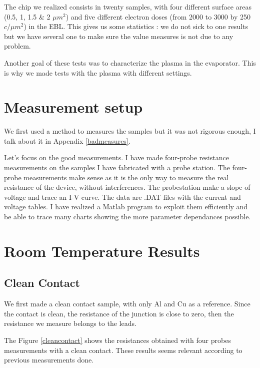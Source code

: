             The chip we realized consists in twenty samples, with four different surface areas (0.5, 1, 1.5 \& 2 $\mu m^2$) and five different electron doses (from 2000 to 3000 by 250 $c/\mu m^2$) in the EBL. This gives us some statistics : we do not sick to one results but we have several one to make sure the value measures is not due to any problem.
            
            Another goal of these tests was to characterize the plasma in the evaporator. This is why we made tests with the plasma with different settings.
            
        \section{Measurement setup}
            
            We first used a method to measures the samples but it was not rigorous enough, I talk about it in Appendix \ref{badmeasures}.
                
                Let's focus on the good measurements. I have made four-probe resistance measurements on the samples I have fabricated with a probe station. The four-probe measurements make sense as it is the only way to measure the real resistance of the device, without interferences. The probestation make a slope of voltage and trace an I-V curve. The data are .DAT files with the current and voltage tables. I have realized a Matlab program to exploit them efficiently and be able to trace many charts showing the more parameter dependances possible.
                
        \section{Room Temperature Results}
                \subsection{Clean Contact}
                We first made a clean contact sample, with only Al and Cu as a reference. Since the contact is clean, the resistance of the junction is close to zero, then the resistance we measure belongs to the leads.
                
                The Figure \ref{cleancontact} shows the resistances obtained with four probes measurements with a clean contact. These results seems relevant according to previous measurements done.
                

